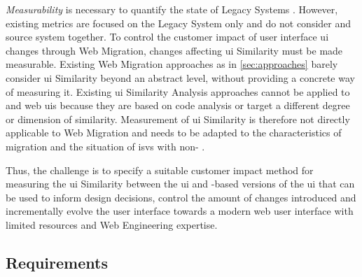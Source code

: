 \emph{Measurability} is necessary to quantify the state of \glspl{Legacy System} \autocite{Masak2006}.
However, existing  metrics are focused on the \gls{Legacy System} only and do not consider  and \gls{source system} together.
To control the customer impact of user interface \gls{ui} changes through \gls{Web Migration}, changes affecting \gls{ui} Similarity must be made measurable.
Existing \gls{Web Migration} approaches as in \cref{sec:approaches} barely consider \gls{ui} Similarity beyond an abstract level, without providing a concrete way of measuring it.
%
Existing \gls{ui} Similarity Analysis approaches cannot be applied to  and \gls{web} \glspl{ui} because they are based on code analysis or target a different degree or dimension of similarity.
Measurement of \gls{ui} Similarity is therefore not directly applicable to \gls{Web Migration} and needs to be adapted to the characteristics of migration and the situation of \glspl{isv} with non-  .

\vspace{-5pt}
Thus, the challenge is to specify a suitable customer impact method for measuring the \gls{ui} Similarity between the  \gls{ui} and -based versions of the \gls{ui} that can be used to inform design decisions, control the amount of changes introduced and incrementally evolve the user interface towards a modern \gls{web} user interface with limited resources and \gls{Web Engineering} expertise.

\vspace{-18pt}
\hypertarget{sec:ci.requirements}{%
\subsection{Requirements}\label{sec:ci.requirements}}
\vspace{6pt}

